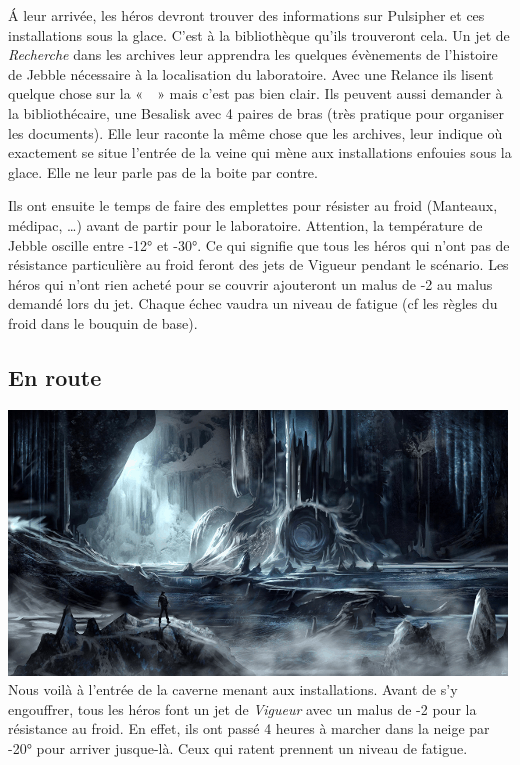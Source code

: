 \'A leur arrivée, les héros devront trouver des informations sur Pulsipher et ces installations sous la glace. C’est à la bibliothèque qu’ils trouveront cela. Un jet de \emph{Recherche} dans les archives leur apprendra les quelques évènements de l’histoire de Jebble nécessaire à la localisation du laboratoire. Avec une Relance ils lisent quelque chose sur la «~~» mais c’est pas bien clair. Ils peuvent aussi demander à la bibliothécaire, une Besalisk avec 4 paires de bras (très pratique pour organiser les documents). Elle leur raconte la même chose que les archives, leur indique où exactement se situe l’entrée de la veine qui mène aux installations enfouies sous la glace. Elle ne leur parle pas de la boite par contre.

Ils ont ensuite le temps de faire des emplettes pour résister au froid (Manteaux, médipac, \ldots) avant de partir pour le laboratoire. Attention, la température de Jebble oscille entre -12° et -30°. Ce qui signifie que tous les héros qui n’ont pas de résistance particulière au froid feront des jets de Vigueur pendant le scénario. Les héros qui n’ont rien acheté pour se couvrir ajouteront un malus de -2 au malus demandé lors du jet. Chaque échec vaudra un niveau de fatigue (cf les règles du froid dans le bouquin de base).

\subsection{En route}
\noindent\includegraphics[width=\linewidth]{_img/places/jebble-cave.png}
Nous voilà à l’entrée de la caverne menant aux installations. Avant de s’y engouffrer, tous les héros font un jet de \emph{Vigueur} avec un malus de -2 pour la résistance au froid. En effet, ils ont passé 4 heures à marcher dans la neige par -20° pour arriver jusque-là. Ceux qui ratent prennent un niveau de fatigue.

